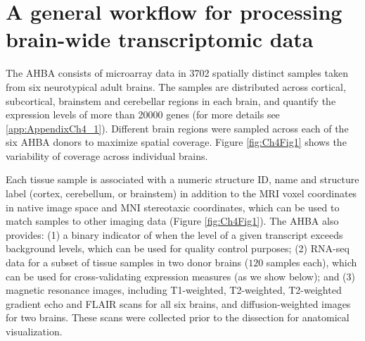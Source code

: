 \section{A general workflow for processing brain-wide transcriptomic data}
The AHBA consists of microarray data in \num{3702} spatially distinct samples taken from six neurotypical adult brains. The samples are distributed across cortical, subcortical, brainstem and cerebellar regions in each brain, and quantify the expression levels of more than \num{20000} genes (for more details see \ref{app:AppendixCh4_1}). Different brain regions were sampled across each of the six AHBA donors to maximize spatial coverage. Figure \ref{fig:Ch4Fig1} shows the  variability of coverage across individual brains.

Each tissue sample is associated with a numeric structure ID, name and structure label (cortex, cerebellum, or brainstem) in addition to the MRI voxel coordinates in native image space and MNI stereotaxic coordinates, which can be used to match samples to other imaging data (Figure \ref{fig:Ch4Fig1}). The AHBA also provides: (1) a binary indicator of when the level of a given transcript exceeds background levels, which can be used for quality control purposes; (2) RNA-seq data for a subset of tissue samples in two donor brains ($120$ samples each), which can be used for cross-validating expression measures (as we show below); and (3) magnetic resonance images, including T1-weighted, T2-weighted, T2-weighted gradient echo and FLAIR scans for all six brains, and diffusion-weighted images for two brains. These scans were collected prior to the dissection for anatomical visualization.

